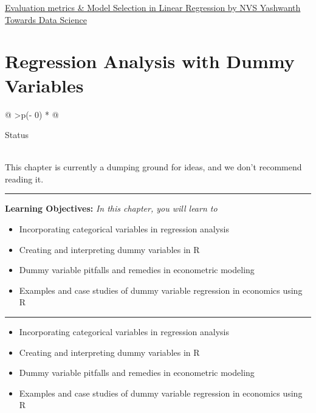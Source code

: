 \documentclass[
  letterpaper,
  paper =a4,
  twoside,
  openright,
  headsepline,
  footsepline,
  listof = totocnumbered,
  chapterprefix = true,
  firstiscover,
  parskip = full*]{scrbook}
\providecommand{\abstractname}{Learning Objectives} %
\newenvironment{objectives}[1]{%
	\hrule
	\vspace{5pt}
	\small\textbf{\abstractname: } 
	\newline
	\vspace{0.1cm}
	\small\emph{#1} %
	\itshape %
}{%
	\vspace{5pt}
	\hrule
	\vspace{0.6cm}
}
\begin{document}
\href{https://towardsdatascience.com/evaluation-metrics-model-selection-in-linear-regression-73c7573208be}{Evaluation
metrics \& Model Selection in Linear Regression \textbar{} by NVS
Yashwanth \textbar{} Towards Data Science}


\chapter{Regression Analysis with Dummy
Variables}\label{regression-analysis-with-dummy-variables}

\begin{longtable}[]{@{}
  >{\centering\arraybackslash}p{(\columnwidth - 0\tabcolsep) * }@{}}
\toprule\noalign{}
\begin{minipage}[b]{\linewidth}\centering
Status
\end{minipage} \\
\midrule\noalign{}
\endhead
\bottomrule\noalign{}
\endlastfoot
This chapter is currently a dumping ground for ideas, and we don't
recommend reading it. \\
\end{longtable}

\begin{objectives}{In this chapter, you will learn to}
\begin{itemize}

\item{Incorporating categorical variables in regression analysis}

\item{Creating and interpreting dummy variables in R}

\item{Dummy variable pitfalls and remedies in econometric modeling}

\item{Examples and case studies of dummy variable regression in economics using R}

\end{itemize}

\end{objectives}

\begin{itemize}
\item
  Incorporating categorical variables in regression analysis
\item
  Creating and interpreting dummy variables in R
\item
  Dummy variable pitfalls and remedies in econometric modeling
\item
  Examples and case studies of dummy variable regression in economics
  using R
\end{itemize}
\end{document}
